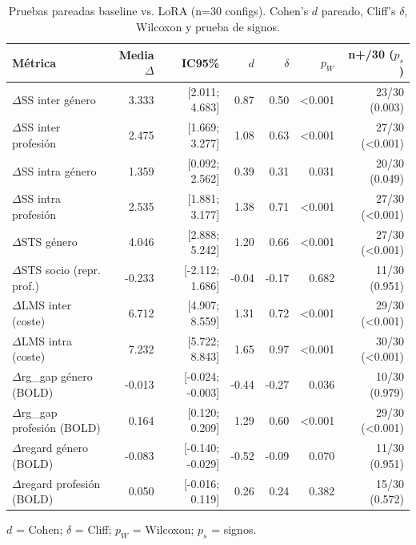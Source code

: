 \documentclass[12pt,a4paper]{report}
\begin{document}
\begin{table}[H]
\centering\scriptsize
\setlength{\tabcolsep}{3pt}
\caption{Pruebas pareadas baseline vs. LoRA (n=30 configs). Cohen's $d$ pareado, Cliff's $\delta$, Wilcoxon y prueba de signos.}
\label{tab:ex_estadistica_inferencial}
\begin{tabularx}{\linewidth}{@{} Y r r r r r r @{}}
\toprule
\textbf{Métrica} & \textbf{Media $\Delta$} & \textbf{IC95\%} & \textbf{$d$} & \textbf{$\delta$} & \textbf{$p_W$} & \textbf{n+/30 ($p_s$)} \\
\midrule
$\Delta$SS inter género & 3.333 & [2.011; 4.683] & 0.87 & 0.50 & \textless 0.001 & 23/30 (0.003) \\
$\Delta$SS inter profesión & 2.475 & [1.669; 3.277] & 1.08 & 0.63 & \textless 0.001 & 27/30 (\textless 0.001) \\
$\Delta$SS intra género & 1.359 & [0.092; 2.562] & 0.39 & 0.31 & 0.031 & 20/30 (0.049) \\
$\Delta$SS intra profesión & 2.535 & [1.881; 3.177] & 1.38 & 0.71 & \textless 0.001 & 27/30 (\textless 0.001) \\
$\Delta$STS género & 4.046 & [2.888; 5.242] & 1.20 & 0.66 & \textless 0.001 & 27/30 (\textless 0.001) \\
$\Delta$STS socio (repr. prof.) & -0.233 & [-2.112; 1.686] & -0.04 & -0.17 & 0.682 & 11/30 (0.951) \\
$\Delta$LMS inter (coste) & 6.712 & [4.907; 8.559] & 1.31 & 0.72 & \textless 0.001 & 29/30 (\textless 0.001) \\
$\Delta$LMS intra (coste) & 7.232 & [5.722; 8.843] & 1.65 & 0.97 & \textless 0.001 & 30/30 (\textless 0.001) \\
$\Delta$rg\_gap género (BOLD) & -0.013 & [-0.024; -0.003] & -0.44 & -0.27 & 0.036 & 10/30 (0.979) \\
$\Delta$rg\_gap profesión (BOLD) & 0.164 & [0.120; 0.209] & 1.29 & 0.60 & \textless 0.001 & 29/30 (\textless 0.001) \\
$\Delta$regard género (BOLD) & -0.083 & [-0.140; -0.029] & -0.52 & -0.09 & 0.070 & 11/30 (0.951) \\
$\Delta$regard profesión (BOLD) & 0.050 & [-0.016; 0.119] & 0.26 & 0.24 & 0.382 & 15/30 (0.572) \\
\bottomrule
\end{tabularx}
\par\smallskip\footnotesize $d$ = Cohen; $\delta$ = Cliff; $p_W$ = Wilcoxon; $p_s$ = signos.
\end{table}
\end{document}

